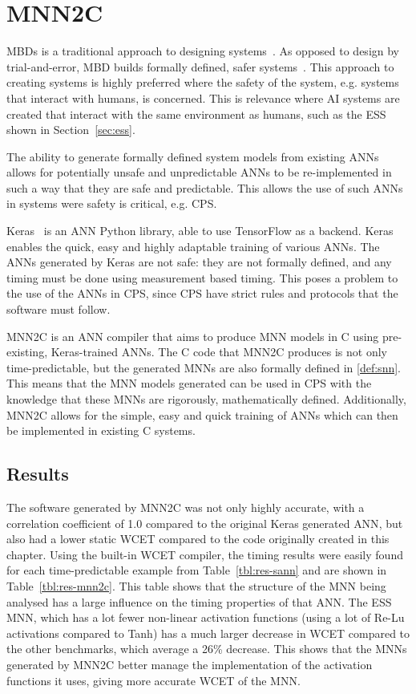 \section{\acf{MNN2C}}
\label{sec:mnn2c}
\acfp{MBD} is a traditional approach to designing systems~\cite{dmd2019}.
As opposed to design by trial-and-error, \ac{MBD} builds formally defined, safer systems~\cite{dmd2019}.
This approach to creating systems is highly preferred where the safety of the system, e.g. systems that interact with humans, is concerned.
This is relevance where \ac{AI} systems are created that interact with the same environment as humans, such as the \acf{ESS} shown in Section~\ref{sec:ess}.

The ability to generate formally defined system models from existing \acp{ANN} allows for potentially unsafe and unpredictable \acp{ANN} to be re-implemented in such a way that they are safe and predictable.
This allows the use of such \acp{ANN} in systems were safety is critical, e.g. \acf{CPS}.

Keras~\cite{chollet2015keras} is an \ac{ANN} Python library, able to use TensorFlow as a backend. 
Keras enables the quick, easy and highly adaptable training of various \acp{ANN}.
The \acp{ANN} generated by Keras are not safe: they are not formally defined, and any timing must be done using measurement based timing. 
This poses a problem to the use of the \acp{ANN} in \ac{CPS}, since \ac{CPS} have strict rules and protocols that the software must follow.

\acf{MNN2C} is an \ac{ANN} compiler that aims to produce \acf{MNN} models in C using pre-existing, Keras-trained \acp{ANN}.
The C code that \ac{MNN2C} produces is not only time-predictable, but the generated \acp{MNN} are also formally defined in \ref{def:snn}.
This means that the \ac{MNN} models generated can be used in \ac{CPS} with the knowledge that these \acp{MNN} are rigorously, mathematically defined. 
Additionally, \ac{MNN2C} allows for the simple, easy and quick training of \acp{ANN} which can then be implemented in existing C systems.

\subsection{Results}
The software generated by \ac{MNN2C} was not only highly accurate, with a correlation coefficient of 1.0 compared to the original Keras generated \ac{ANN}, but also had a lower static \ac{WCET} compared to the code originally created in this chapter.
Using the built-in \ac{WCET} compiler, the timing results were easily found for each time-predictable example from Table~\ref{tbl:res-sann} and are shown in Table~\ref{tbl:res-mnn2c}.
This table shows that the structure of the \ac{MNN} being analysed has a large influence on the timing properties of that \ac{ANN}. 
The \ac{ESS} \ac{MNN}, which has a lot fewer non-linear activation functions (using a lot of Re-Lu activations compared to Tanh) has a much larger decrease in \ac{WCET} compared to the other benchmarks, which average a 26\% decrease.
This shows that the \acp{MNN} generated by \ac{MNN2C} better manage the implementation of the activation functions it uses, giving more accurate \ac{WCET} of the \ac{MNN}.

